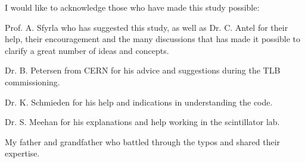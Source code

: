 
\begin{acknowledgements}      


I would like to acknowledge those who have made this study possible:

Prof. A. Sfyrla who has suggested this study, as well as Dr. C. Antel for their help, their encouragement and the many discussions that has made it possible to clarify a great number of ideas and concepts.

Dr. B. Petersen from CERN for his advice and suggestions during the TLB commissioning.

Dr. K. Schmieden for his help and indications in understanding the code.

Dr. S. Meehan for his explanations and help working in the scintillator lab.

My father and grandfather who battled through the typos and shared their expertise.

\end{acknowledgements}
